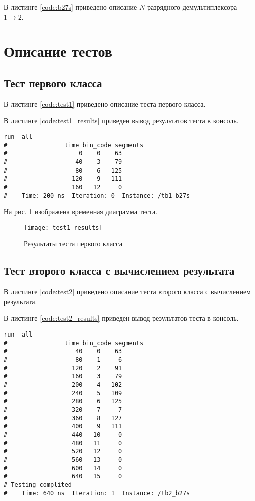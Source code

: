 \noindent В листинге \ref{code:b27s} приведено описание $N$-разрядного демультиплексора $1 \rightarrow 2$.


\section{Описание тестов}
\label{sec:tests}

\subsection{Тест первого класса}

В листинге \ref{code:test1} приведено описание теста первого класса.


В листинге \ref{code:test1_results} приведен вывод результатов теста в консоль.
\begin{lstlisting}[caption=Результаты теста первого класса, label=code:test1_results, language={}]
run -all
# 		         time bin_code segments
#                    0    0    63
#                   40    3    79
#                   80    6   125
#                  120    9   111
#                  160   12     0
#    Time: 200 ns  Iteration: 0  Instance: /tb1_b27s
\end{lstlisting}

На рис. \ref{fig:test1_results} изображена временная диаграмма теста.
\begin{figure}[H]
	\begin{center}
		\texttt{[image: test1\_results]}
		\caption{Результаты теста первого класса}
		\label{fig:test1_results}
	\end{center}
\end{figure}

\subsection{Тест второго класса с вычислением результата}

В листинге \ref{code:test2} приведено описание теста второго класса с вычислением результата.


В листинге \ref{code:test2_results} приведен вывод результатов теста в консоль.
\begin{lstlisting}[caption=Результаты теста второго класса с вычислением результата, label=code:test2_results, language={}]
run -all
# 		         time bin_code segments
#                   40    0    63
#                   80    1     6
#                  120    2    91
#                  160    3    79
#                  200    4   102
#                  240    5   109
#                  280    6   125
#                  320    7     7
#                  360    8   127
#                  400    9   111
#                  440   10     0
#                  480   11     0
#                  520   12     0
#                  560   13     0
#                  600   14     0
#                  640   15     0
# Testing complited
#    Time: 640 ns  Iteration: 1  Instance: /tb2_b27s
\end{lstlisting}

